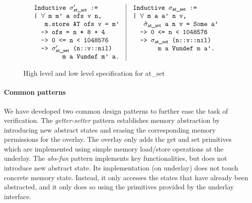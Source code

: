 \begin{figure}[t]\scriptsize
$$
\begin{array}{l|l}
\begin{array}[t]{l}
\verb+Inductive +\sigma'_\textsf{at\_set}\verb+ :=+\\
\verb"| "\forall\verb+ m m' a ofs v n,+\\
\verb+   m.store AT ofs v = m'+\\
\verb"  ->"\verb" ofs = n * 8 + 4"\\
\verb"  ->"\verb" 0 <= n < 1048576"\\
\verb"  ->"\verb" "\sigma'_\textsf{at\_set}\verb" (n::v::nil)"\\
\verb"        m a Vundef m' a."
\end{array}
&
\begin{array}[t]{l}
\verb+Inductive +\sigma_\textsf{at\_set}\verb+ :=+\\
\verb"| "\forall\verb+ m a a' n v,+\\
\verb+   +\hat{\sigma}_\textsf{at\_set}\verb+ a n v = Some a'+\\
\verb"  ->"\verb" 0 <= n < 1048576"\\
\verb"  -> "\sigma_\textsf{at\_set} \verb" (n::v::nil)"\\
\verb"       m a Vundef m a'."
\end{array}
\end{array}
$$ 
\caption{High level and low level specification for \textsf{at\_set}}
\label{fig:alt:spec}
\end{figure}

\paragraph{Common patterns}
We have developed two common design patterns to further ease the task of
verification. The {\it getter-setter} pattern establishes memory
abstraction by introducing new abstract states and erasing
the corresponding memory permissions for the overlay.
The overlay only adds the \textsf{get}
and \textsf{set} primitives which are implemented using simple
memory load/store operations at the underlay.
The {\it abs-fun} pattern implements key functionalities, but does not
introduce new abstract state. Its implementation (on underlay) does
not touch concrete memory state. Instead, it only accesses the states
that have already been abstracted, and it only does
so using the primitives provided by the underlay interface.

